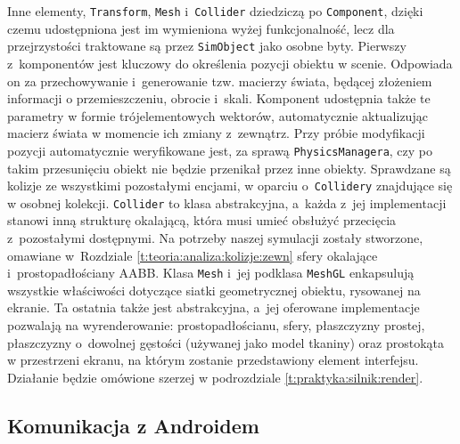 		Inne elementy, \texttt{Transform}, \texttt{Mesh} i~\texttt{Collider} dziedziczą po \texttt{Component}, dzięki czemu udostępniona jest im wymieniona wyżej funkcjonalność, lecz dla przejrzystości traktowane są przez \texttt{SimObject} jako osobne byty. Pierwszy z~komponentów jest kluczowy do określenia pozycji obiektu w scenie. Odpowiada on za przechowywanie i~generowanie tzw. macierzy świata, będącej złożeniem informacji o przemieszczeniu, obrocie i~skali. Komponent udostępnia także te parametry w formie trójelementowych wektorów, automatycznie aktualizując macierz świata w momencie ich zmiany z~zewnątrz. Przy próbie modyfikacji pozycji automatycznie weryfikowane jest, za sprawą \texttt{PhysicsManagera}, czy po takim przesunięciu obiekt nie będzie przenikał przez inne obiekty. Sprawdzane są kolizje ze wszystkimi pozostałymi encjami, w oparciu o~\texttt{Collidery} znajdujące się w osobnej kolekcji. \texttt{Collider} to klasa abstrakcyjna, a~każda z~jej implementacji stanowi inną strukturę okalającą, która musi umieć obsłużyć przecięcia z~pozostałymi dostępnymi. Na potrzeby naszej symulacji zostały stworzone, omawiane w~Rozdziale \ref{t:teoria:analiza:kolizje:zewn} sfery okalające i~prostopadłościany AABB. Klasa \texttt{Mesh} i~jej podklasa \texttt{MeshGL} enkapsulują wszystkie właściwości dotyczące siatki geometrycznej obiektu, rysowanej na ekranie. Ta ostatnia także jest abstrakcyjna, a~jej oferowane implementacje pozwalają na wyrenderowanie: prostopadłościanu, sfery, płaszczyzny prostej, płaszczyzny o~dowolnej gęstości (używanej jako model tkaniny) oraz prostokąta w przestrzeni ekranu, na którym zostanie przedstawiony element interfejsu. Działanie będzie omówione szerzej w podrozdziale \ref{t:praktyka:silnik:render}.
		
		\subsection{Komunikacja z Androidem}
		\label{t:praktyka:silnik:andro}
		
		
